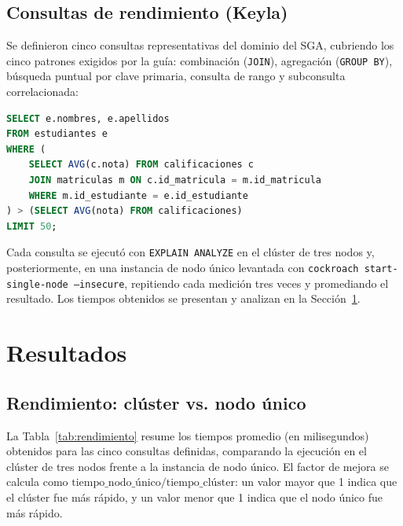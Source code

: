 \documentclass[10pt,a4paper]{article}
\begin{document}
\subsection{Consultas de rendimiento (Keyla)}
 
Se definieron cinco consultas representativas del dominio del SGA,
cubriendo los cinco patrones exigidos por la guía: combinación
(\texttt{JOIN}), agregación (\texttt{GROUP BY}), búsqueda puntual por
clave primaria, consulta de rango y subconsulta correlacionada:
 
\begin{lstlisting}[language=SQL, caption={Subconsulta correlacionada: estudiantes por encima del promedio general}, label={lst:subquery}]
SELECT e.nombres, e.apellidos
FROM estudiantes e
WHERE (
    SELECT AVG(c.nota) FROM calificaciones c
    JOIN matriculas m ON c.id_matricula = m.id_matricula
    WHERE m.id_estudiante = e.id_estudiante
) > (SELECT AVG(nota) FROM calificaciones)
LIMIT 50;
\end{lstlisting}
 
Cada consulta se ejecutó con \texttt{EXPLAIN ANALYZE} en el clúster de
tres nodos y, posteriormente, en una instancia de nodo único levantada con
\texttt{cockroach start-single-node --insecure}, repitiendo cada medición
tres veces y promediando el resultado. Los tiempos obtenidos se presentan
y analizan en la Sección~\ref{sec:resultados}.


\section{Resultados}
\label{sec:resultados}
 
\subsection{Rendimiento: clúster vs. nodo único}
 
La Tabla~\ref{tab:rendimiento} resume los tiempos promedio (en
milisegundos) obtenidos para las cinco consultas definidas, comparando la
ejecución en el clúster de tres nodos frente a la instancia de nodo único.
El factor de mejora se calcula como
$\text{tiempo\_nodo\_único} / \text{tiempo\_clúster}$: un valor mayor que
1 indica que el clúster fue más rápido, y un valor menor que 1 indica que
el nodo único fue más rápido.
 
\end{document}
